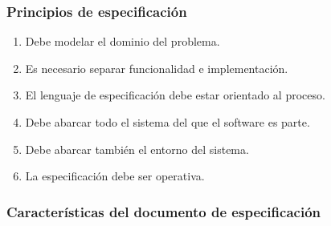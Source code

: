 \subsubsection{Principios de especificación}
\begin{enumerate}
    \item Debe modelar el dominio del problema.
    \item Es necesario separar funcionalidad e implementación.
    \item El lenguaje de especificación debe estar orientado al proceso.
    \item Debe abarcar todo el sistema del que el software es parte.
    \item Debe abarcar también el entorno del sistema.
    \item La especificación debe ser operativa.
\end{enumerate}

\subsubsection{Características del documento de especificación}

